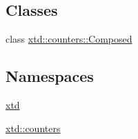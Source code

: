 \subsection*{Classes}
\begin{DoxyCompactItemize}
\item 
class \hyperlink{classxtd_1_1counters_1_1Composed}{xtd\-::counters\-::\-Composed}
\end{DoxyCompactItemize}
\subsection*{Namespaces}
\begin{DoxyCompactItemize}
\item 
\hyperlink{namespacextd}{xtd}
\item 
\hyperlink{namespacextd_1_1counters}{xtd\-::counters}
\end{DoxyCompactItemize}
